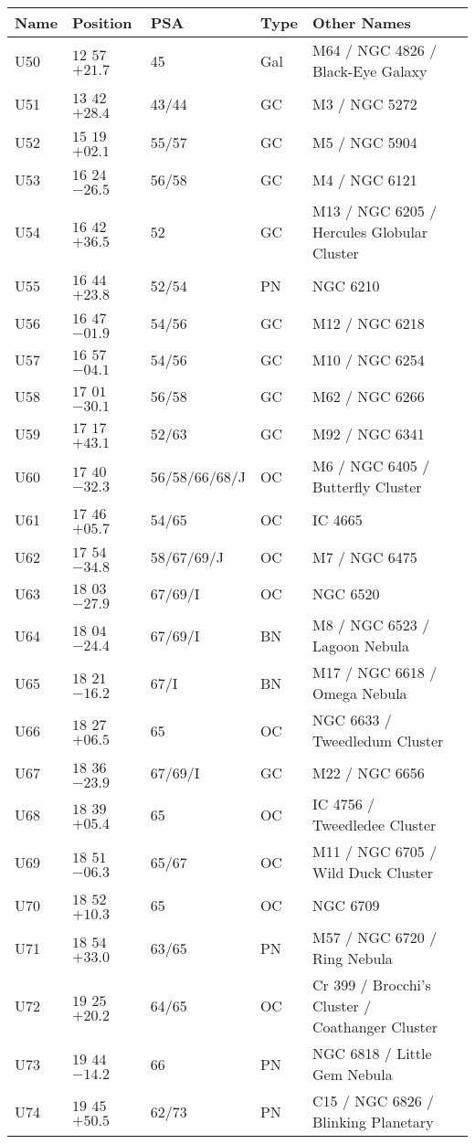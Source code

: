 \begin{table}[p]
\setlength{\tabcolsep}{3pt}
\scriptsize
\begin{tabular}{llllll}
\hline
Name&Position&PSA&Type&Other Names\\
\hline
U50&$12$ $57$ $+21.7$&45&Gal&M64 / NGC 4826 / Black-Eye Galaxy\\
U51&$13$ $42$ $+28.4$&43/44&GC&M3 / NGC 5272\\
U52&$15$ $19$ $+02.1$&55/57&GC&M5 / NGC 5904\\
U53&$16$ $24$ $-26.5$&56/58&GC&M4 / NGC 6121\\
U54&$16$ $42$ $+36.5$&52&GC&M13 / NGC 6205 / Hercules Globular Cluster\\
U55&$16$ $44$ $+23.8$&52/54&PN&NGC 6210\\
U56&$16$ $47$ $-01.9$&54/56&GC&M12 / NGC 6218\\
U57&$16$ $57$ $-04.1$&54/56&GC&M10 / NGC 6254\\
U58&$17$ $01$ $-30.1$&56/58&GC&M62 / NGC 6266\\
U59&$17$ $17$ $+43.1$&52/63&GC&M92 / NGC 6341\\
U60&$17$ $40$ $-32.3$&56/58/66/68/J&OC&M6 / NGC 6405 / Butterfly Cluster\\
U61&$17$ $46$ $+05.7$&54/65&OC&IC 4665\\
U62&$17$ $54$ $-34.8$&58/67/69/J&OC&M7 / NGC 6475\\
U63&$18$ $03$ $-27.9$&67/69/I&OC&NGC 6520\\
U64&$18$ $04$ $-24.4$&67/69/I&BN&M8 / NGC 6523 / Lagoon Nebula\\
U65&$18$ $21$ $-16.2$&67/I&BN&M17 / NGC 6618 / Omega Nebula\\
U66&$18$ $27$ $+06.5$&65&OC&NGC 6633 / Tweedledum Cluster\\
U67&$18$ $36$ $-23.9$&67/69/I&GC&M22 / NGC 6656\\
U68&$18$ $39$ $+05.4$&65&OC&IC 4756 / Tweedledee Cluster\\
U69&$18$ $51$ $-06.3$&65/67&OC&M11 / NGC 6705 / Wild Duck Cluster\\
U70&$18$ $52$ $+10.3$&65&OC&NGC 6709\\
U71&$18$ $54$ $+33.0$&63/65&PN&M57 / NGC 6720 / Ring Nebula\\
U72&$19$ $25$ $+20.2$&64/65&OC&Cr 399 / Brocchi's Cluster / Coathanger Cluster\\
U73&$19$ $44$ $-14.2$&66&PN&NGC 6818 / Little Gem Nebula\\
U74&$19$ $45$ $+50.5$&62/73&PN&C15 / NGC 6826 / Blinking Planetary\\

\end{tabular}
\end{table}
